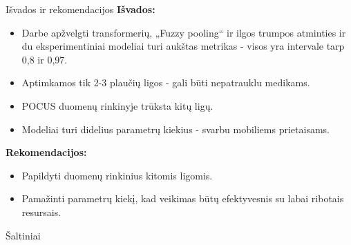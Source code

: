 \documentclass{VUMIFSlides}
\begin{document}
\begin{frame}[c]{Išvados ir rekomendacijos}{}
    {\bf Išvados:}
    \begin{itemize}
        \item Darbe apžvelgti transformerių, „Fuzzy pooling“ ir ilgos trumpos atminties ir du eksperimentiniai modeliai turi aukštas metrikas - visos yra intervale tarp 0,8 ir 0,97.
        \item Aptimkamos tik 2-3 plaučių ligos - gali būti nepatrauklu medikams.
        \item POCUS duomenų rinkinyje trūksta kitų ligų.
        \item Modeliai turi didelius parametrų kiekius - svarbu mobiliems prietaisams.
    \end{itemize}
    \vspace{0.5cm}
    {\bf Rekomendacijos:}
        \begin{itemize}
        \item Papildyti duomenų rinkinius kitomis ligomis.
        \item Pamažinti parametrų kiekį, kad veikimas būtų efektyvesnis su labai ribotais resursais.
    \end{itemize}
\end{frame}


\begin{frame}[allowframebreaks]{Šaltiniai}
    \printbibliography 
\end{frame}

 \begin{frame}
  \maketitle
\end{frame}
\end{document}
